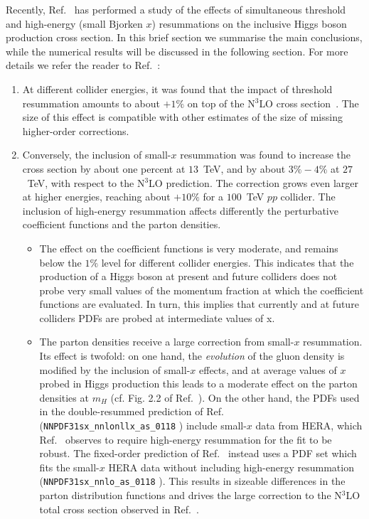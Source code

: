 Recently, Ref.~\cite{Bonvini:2018ixe} has performed a study of the
effects of simultaneous threshold and high-energy (small Bjorken $x$)
resummations on the inclusive Higgs boson production cross section. In this brief
section we summarise the main conclusions, while the numerical results
will be discussed in the following section. For more details we refer
the reader to Ref.~\cite{Bonvini:2018ixe}:
\begin{enumerate}
\item At different collider energies, it was found that the impact of
  threshold resummation amounts to about $+1\%$ on top of the N$^3$LO
  cross section~\cite{Bonvini:2016frm}. The size of this effect is
  compatible with other estimates of the size of missing higher-order
  corrections.
\item Conversely, the inclusion of small-$x$ resummation was found to
  increase the cross section by about one percent at $13$~TeV, and by
  about $3\%-4\%$ at $27$~TeV, with respect to the N$^3$LO
  prediction. The correction grows even larger at higher 
  energies, reaching about $+10\%$ for a $100$~TeV $pp$ collider. The
  inclusion of high-energy resummation affects differently the
  perturbative coefficient functions and the parton densities.
\begin{itemize}
\item The effect on the coefficient functions is very moderate, and
  remains below the $1\%$ level for different collider energies. This
  indicates that the production of a Higgs boson at present and future
  colliders does not probe very small values of the momentum fraction
  at which the coefficient functions are evaluated.
  In turn, this implies that currently and at future colliders PDFs are probed at intermediate values of x.

\item The parton densities receive a large correction from small-$x$
  resummation. Its effect is twofold: on one hand, the {\it evolution}
  of the gluon density is modified by the inclusion of small-$x$
  effects, and at average values of $x$ probed in Higgs production
  this leads to a moderate effect on the parton densities at $m_H$
  (cf. Fig. 2.2 of Ref.~\cite{Ball:2017otu}). On the other hand, the
  PDFs used in the double-resummed prediction of
  Ref.~\cite{Bonvini:2018ixe} (\verb+NNPDF31sx_nnlonllx_as_0118+
  \cite{Ball:2017otu}) include small-$x$ data from HERA, which
  Ref.~\cite{Ball:2017otu} observes to require high-energy resummation
  for the fit to be robust. The fixed-order prediction of
  Ref.~\cite{Bonvini:2018ixe} instead uses a PDF set which fits the
  small-$x$ HERA data without including high-energy resummation
  (\verb+NNPDF31sx_nnlo_as_0118+ \cite{Ball:2017otu}).  This results
  in sizeable differences in the parton distribution functions and
  drives the large correction to the N$^3$LO total cross section
  observed in Ref.~\cite{Bonvini:2018ixe}.
\end{itemize}
\end{enumerate}
